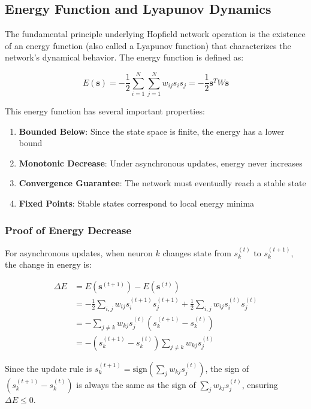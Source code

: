 \documentclass[11pt,a4paper]{article}
\begin{document}
\subsection{Energy Function and Lyapunov Dynamics}

The fundamental principle underlying Hopfield network operation is the existence of an energy function (also called a Lyapunov function) that characterizes the network's dynamical behavior. The energy function is defined as:

\begin{equation}
E(\mathbf{s}) = -\frac{1}{2} \sum_{i=1}^{N} \sum_{j=1}^{N} w_{ij} s_i s_j = -\frac{1}{2} \mathbf{s}^T W \mathbf{s}
\label{eq:energy_detailed}
\end{equation}

This energy function has several important properties:

\begin{enumerate}
    \item \textbf{Bounded Below}: Since the state space is finite, the energy has a lower bound
    \item \textbf{Monotonic Decrease}: Under asynchronous updates, energy never increases
    \item \textbf{Convergence Guarantee}: The network must eventually reach a stable state
    \item \textbf{Fixed Points}: Stable states correspond to local energy minima
\end{enumerate}

\subsubsection{Proof of Energy Decrease}

For asynchronous updates, when neuron $k$ changes state from $s_k^{(t)}$ to $s_k^{(t+1)}$, the change in energy is:

\begin{align}
\Delta E &= E(\mathbf{s}^{(t+1)}) - E(\mathbf{s}^{(t)}) \\
&= -\frac{1}{2} \sum_{i,j} w_{ij} s_i^{(t+1)} s_j^{(t+1)} + \frac{1}{2} \sum_{i,j} w_{ij} s_i^{(t)} s_j^{(t)} \\
&= -\sum_{j \neq k} w_{kj} s_j^{(t)} (s_k^{(t+1)} - s_k^{(t)}) \\
&= -(s_k^{(t+1)} - s_k^{(t)}) \sum_{j \neq k} w_{kj} s_j^{(t)}
\end{align}

Since the update rule is $s_k^{(t+1)} = \text{sign}(\sum_{j} w_{kj} s_j^{(t)})$, the sign of $(s_k^{(t+1)} - s_k^{(t)})$ is always the same as the sign of $\sum_{j} w_{kj} s_j^{(t)}$, ensuring $\Delta E \leq 0$.
\end{document}

